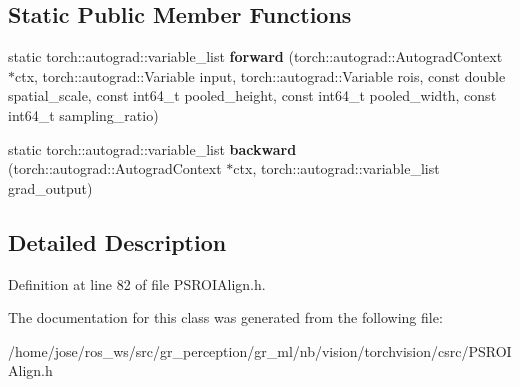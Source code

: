 \subsection*{Static Public Member Functions}
\begin{DoxyCompactItemize}
\item 
\mbox{\label{classPSROIAlignFunction_a82d723ea72f217a7fe07bd774a676c4e}} 
static torch\+::autograd\+::variable\+\_\+list {\bfseries forward} (torch\+::autograd\+::\+Autograd\+Context $\ast$ctx, torch\+::autograd\+::\+Variable input, torch\+::autograd\+::\+Variable rois, const double spatial\+\_\+scale, const int64\+\_\+t pooled\+\_\+height, const int64\+\_\+t pooled\+\_\+width, const int64\+\_\+t sampling\+\_\+ratio)
\item 
\mbox{\label{classPSROIAlignFunction_aedff37647a8c9622199e73bccd5f0309}} 
static torch\+::autograd\+::variable\+\_\+list {\bfseries backward} (torch\+::autograd\+::\+Autograd\+Context $\ast$ctx, torch\+::autograd\+::variable\+\_\+list grad\+\_\+output)
\end{DoxyCompactItemize}


\subsection{Detailed Description}


Definition at line 82 of file P\+S\+R\+O\+I\+Align.\+h.



The documentation for this class was generated from the following file\+:\begin{DoxyCompactItemize}
\item 
/home/jose/ros\+\_\+ws/src/gr\+\_\+perception/gr\+\_\+ml/nb/vision/torchvision/csrc/P\+S\+R\+O\+I\+Align.\+h\end{DoxyCompactItemize}
